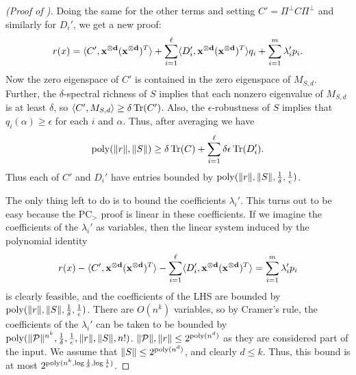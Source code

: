 \begin{proof}[(Proof of )]
Doing the same for the other terms and setting $C' = \Pi^\perp C \Pi^\perp$ and similarly for $D_i'$, we get a new proof:
\[r(x) = \langle C', \mathbf{x^{\otimes d}}(\mathbf{x^{\otimes d}})^T\rangle + \sum_{i=1}^\ell \langle D_i', \mathbf{x^{\otimes d}}(\mathbf{x^{\otimes d}})^T\rangle q_i + \sum_{i=1}^m \lambda_i' p_i.\]
Now the zero eigenspace of $C'$ is contained in the zero eigenspace of $M_{S,d}$. Further, the $\delta$-spectral richness of $S$ implies that each nonzero eigenvalue of $M_{S,d}$ is at least $\delta$, so $\left\langle C',M_{S,d}\right\rangle \geq \delta \operatorname{Tr}(C')$. Also, the $\epsilon$-robustness of $S$ implies that $q_i(\alpha) \geq \epsilon$ for each $i$ and $\alpha$. Thus, after averaging we have 
\[\operatorname{poly}(\|r\|,\|S\|) \geq \delta \operatorname{Tr}(C) + \sum_{i=1}^\ell \delta \epsilon\operatorname{Tr}(D_i').\]
Thus each of $C'$ and $D_i'$ have entries bounded by $\operatorname{poly}(\|r\|, \|S\|, \frac{1}{\delta}, \frac{1}{\epsilon})$.

The only thing left to do is to bound the coefficients $\lambda_i'$. This turns out to be easy because the PC$_>$ proof is linear in these coefficients. If we imagine the coefficients of the $\lambda_i'$ as variables, then the linear system induced by the polynomial identity
\[r(x) - \langle C', \mathbf{x^{\otimes d}}(\mathbf{x^{\otimes d}})^T\rangle - \sum_{i=1}^\ell \langle D_i', \mathbf{x^{\otimes d}}(\mathbf{x^{\otimes d}})^T\rangle = \sum_{i=1}^m \lambda_i' p_i\]
is clearly feasible, and the coefficients of the LHS are bounded by $\operatorname{poly}(\|r\|, \|S\|, \frac{1}{\delta}, \frac{1}{\epsilon})$. There are $O(n^k)$ variables, so by Cramer's rule, the coefficients of the $\lambda_i'$ can be taken to be bounded by $\operatorname{poly}(\|\mathcal P\|^{n^k}, \frac{1}{\delta}, \frac{1}{\epsilon}, \|r\|, \|S\|, n!)$. $\|\mathcal P\|, \|r\| \leq 2^{\operatorname{poly}(n^d)}$ as they are considered part of the input. We assume that $\|S\| \leq 2^{\operatorname{poly}(n^d)}$, and clearly $d \leq k$. Thus, this bound is at most $2^{\operatorname{poly}(n^k, \log \frac{1}{\delta}, \log \frac{1}{\epsilon})}$. 
\end{proof}

